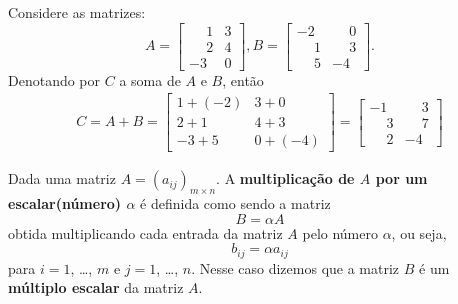 \documentclass{beamer}
\begin{document}
  \begin{frame}
    \begin{exemplos}
      Considere as matrizes:
      \[
        A = \begin{bmatrix}
          \phantom{-}1 & 3\\
          \phantom{-}2 & 4\\
          -3 & 0
        \end{bmatrix}, 
       B = \begin{bmatrix}
          -2 & \phantom{-}0\\
          \phantom{-}1 & \phantom{-}3\\
          \phantom{-}5 & -4 
        \end{bmatrix}.
    \]
    Denotando por $C$ a soma de $A$ e $B$, então
    \begin{eqnarray*}
     C = A + B = \begin{bmatrix}
       1 + (-2) & 3 + 0\\
       2 + 1 & 4 + 3\\
       -3 + 5 & 0 + (-4)
     \end{bmatrix} = \begin{bmatrix}
      -1 & \phantom{-}3\\
      \phantom{-}3 & \phantom{-}7\\
      \phantom{-}2 & -4
     \end{bmatrix} 
    \end{eqnarray*}
    \end{exemplos}
  \end{frame}

  \begin{frame}
    \begin{definicao}
      Dada uma matriz $A = (a_{ij})_{m \times n}$. A \textbf{multiplicação de $A$ por um escalar(número) $\alpha$} é definida
      como sendo a matriz
      \[
        B = \alpha A 
      \]
      obtida multiplicando cada entrada da matriz $A$ pelo número $\alpha$, ou seja,
      \[
        b_{ij} = \alpha a_{ij}
      \]
      para $i = 1$, \dots, $m$ e $j = 1$, \dots, $n$. Nesse caso dizemos que a matriz $B$ é um \textbf{múltiplo escalar} da matriz $A$.
    \end{definicao}
  \end{frame}
\end{document}
